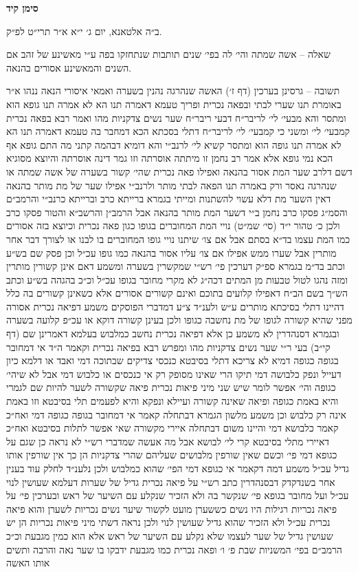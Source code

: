 \documentclass[12pt, openany]{book}
\newcommand{\chapname}{}
\newcommand{\newchap}[1]{
	\addcontentsline{toc}{chapter}{#1}
	\renewcommand{\chapname}{#1}
		\begin{center}
			\textbf{%
\fontsize{16pt}{16pt}\selectfont
				#1}
		\end{center}
}
\begin{document}
\newchap{סימן קיד}
\begin{multicols}{2}
ב״ה אלטאנא, יום ג׳ י״א א״ר תרי״ט לפ״ק.\\\vspace{0pt}

שאלה – אשה שמתה והי׳ לה בפי׳ שנים תותבות שנתחזקו בפה ע״י מאשינע של זהב אם השנים והמאשינע אסורים בהנאה.\\\vspace{0pt}

תשובה – גרסינן בערכין (דף ז׳) האשה שנהרגה נהנין בשערה ואמאי איסורי הנאה ננהו א״ר באומרת תנו שערי לבתי ובפאה נכרית ופריך טעמא דאמרה תנו הא לא אמרה תנו גופא הוא ומתסר והא מבעי׳ לי׳ לריבר״ח דבעי ריבר״ח שער נשים צדקניות מהו ואמר רבא בפאה נכרית קמבעי׳ לי׳ ומשני כי קמבעי׳ לי׳ לריבר״ח דתלי בסכתא הכא דמחבר בה טעמא דאמרה תנו הא לא אמרה תנו גופה הוא ומתסר קשיא לי׳ לרנב״י והא דומיא דבהמה קתני מה התם גופא אף הכא נמי גופא אלא אמר רב נחמן זו מיתתה אוסרתה וזו גמר דינה אוסרתה והיוצא מסוגיא דשם דלרב שער המת אסור בהנאה ואפילו פאה נכרית שהי׳ קשור בשערה של אשה שמתה או שנהרגה נאסר ורק באמרה תנו הפאה לבתי מותר ולרנב״י אפילו שער של מת מותר בהנאה דאין השער מת דלא עשוי להשתנות ומייתי בגמרא ברייתא כרב וברייתא כרנב״י והרמב״ם והסמ״ג פסקו כרב נחמן ב״י דשער המת מותר בהנאה אבל הרמב״ן והרשב״א והטור פסקו כרב ולכן כ׳ טהור י״ד (סי׳ שמ״ט) נויי המת המחוברים בגופו כגון פאה נכרית וכיוצא בזה אסורים כמו המת עצמו בד״א בסתם אבל אם צו׳ שיתנו נויי גופו המחוברים בו לבנו או לצורך דבר אחר מותרין אבל שערו ממש אפילו אם צו׳ עליו אסור בהנאה כמו גופו עכ״ל וכן פסק שם בש״ע וכתב בד״מ בגמרא ספ״ק דערכין פי׳ רש״י שמקשרין בשערה ומשמע דאם אינן קשורין מותרין ומזה נהגו לטול טבעות מן המתים דכה״ג לא מקרי מחובר בגופו עכ״ל וכ״כ בהגהה בש״ע וכתב הש״ך בשם הב״ח דאפילו קלועים בתוכם ואינם קשורים אסורים אלא כשאינן קשורים בה כלל דהיינו דתלי בסיכתא מותרים ע״ש ולענ״ד צ״ע דמדברי הפוסקים משמע דפיאה נכרית אסורה מפני שהיא קשורה לגופו של מת נחשבה כגופו ולכן בעינן קשורה דוקא או עכ״פ קלועה בשערה ובגמרא דסנהדרין לא משמע כן אלא דפיאה נכרית נחשב כמלבוש בעלמא דאמרינן שם (דף קי״ב) בעי ר״י שער נשים צדקניות מהו ומפרש רבא בפיאה נכרית וקאמר ה״ד אי דמחובר בגופה כגופה דמיא לא צריכא דתלי בסיבטא כנכסי צדיקים שבתוכה דמי ואבד או דלמא כיון דעייל ונפק כלבושה דמי תיקו הרי שאינו מסופק רק אי כנכסים או כלבוש דמי אבל לא שיהי׳ כגופה והי׳ אפשר לומר שיש שני מיני פיאות נכרית פיאה שקשורה לשער להיות שם לגמרי והיא באמת כגופה ופיאה שאינה קשורה ועיילא ונפקא והיא לפעמים תלי בסיבטא וזו באמת אינה רק כלבוש וכן משמע מלשון הגמרא דבתחלה קאמר אי דמחובר בגופה כגופה דמי ואח״כ קאמר כלבושא דמי והיינו משום דבתחלה איירי מקשורה שאי אפשר לתלות בסיבטא ואח״כ דאיירי מתלי בסיבטא קרי לי׳ לבושא אבל מה אעשה שמדברי רש״י לא נראה כן שגם על כגופא דמי פי׳ וכשם שאין שורפין מלבושים שעליהם שהרי צדקניות הן כך אין שורפין אותו גדיל עכ״ל משמע דמה דקאמר אי כגופא דמי הפי׳ שהוא כמלבוש ולכן נלענ״ד לחלק עוד בענין אחר בשנדקדק דבסנהדרין כתב רש״י על פיאה נכרית גדיל של שערות דעלמא שעושין לנוי עכ״ל ועל מחובר בגופא פי׳ שנקשר בה ולא הזכיר שנקלע עם השיער של ראש ובערכין פי׳ על פיאה נכריות רגילות היו נשים כששערן מועט לקשור שיער נשים נכריות לשערן והוא פיאה נכרית עכ״ל ולא הזכיר שהוא גדיל שעושין לנוי ולכן נראה דשתי מיני פיאות נכריות הן יש שעושין גדיל של שער לעצמו שלא נקלע עם השיער של ראש אלא הוא כמין מגבעת וכ״כ הרמב״ם בפי׳ המשניות שבת פ׳ ו׳ ופאה נכרית כמו מגבעת ידבקו בו שער נאה והרבה ותשים אותו האשה 
\end{multicols}
\end{document}
